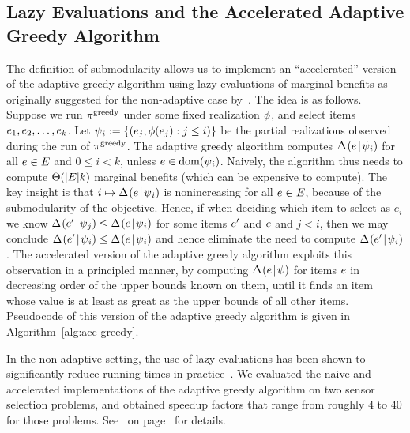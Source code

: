 \subsection{Lazy Evaluations and the Accelerated Adaptive Greedy
  Algorithm} 
The definition of \term submodularity 
allows us to implement an 
``accelerated'' version of the adaptive greedy algorithm using lazy evaluations
of marginal benefits as originally suggested for the
non-adaptive case by~\citet{minoux78}.
The idea is as follows.
Suppose we run $\greedypolicy$ under some fixed realization $\rlz$,
and select items $\elem_1, \elem_2, \ldots, \elem_k$.
Let $\prlz_i := \set{(\elem_j, \rlz(\elem_j) : j \le i)}$ be the
partial realizations observed during the run of $\greedypolicy$.
%
The adaptive greedy algorithm computes $\diff{\prlz_i}{\elem}$ for all $\elem \in \groundset$ and
$0 \le i < k$, unless $\elem \in \dom(\prlz_i)$.
Naively, the algorithm thus needs to compute $\Theta(|\groundset| k)$ marginal benefits (which can be expensive to compute).
The key insight is that 
$i \mapsto \diff{\prlz_i}{\elem}$ is nonincreasing for all $\elem \in
\groundset$, because of the \term submodularity of the
objective.
Hence, if when deciding which item to select as $e_i$ we know
$ \diff{\prlz_j}{\elem'} \le  \diff{\prlz_i}{\elem}$ for some items $\elem'$ and
$\elem$ and $j < i$, then we may conclude $\diff{\prlz_i}{\elem'} \le \diff{\prlz_i}{\elem}$ and hence 
eliminate the need to compute $\diff{\prlz_i}{\elem'}$. 
The accelerated version of the adaptive greedy algorithm exploits this
observation in a principled manner, by computing $\diff{\prlz}{\elem}$
for items $\elem$ in decreasing order of the upper bounds known on
them, until it finds an item whose value is at least as great as the upper bounds of
all other items.  Pseudocode of this version of the adaptive greedy algorithm is given in Algorithm~\ref{alg:acc-greedy}.
%


In the non-adaptive setting, the use of lazy evaluations has been shown
to significantly reduce running times in practice~\citep{leskovec07}.  
We evaluated the naive and accelerated implementations of the
adaptive greedy algorithm on two sensor selection problems, and obtained
speedup factors that range from roughly $4$ to $40$ for those problems.
See~ on page~\pageref{sec:experiments} for details.  


